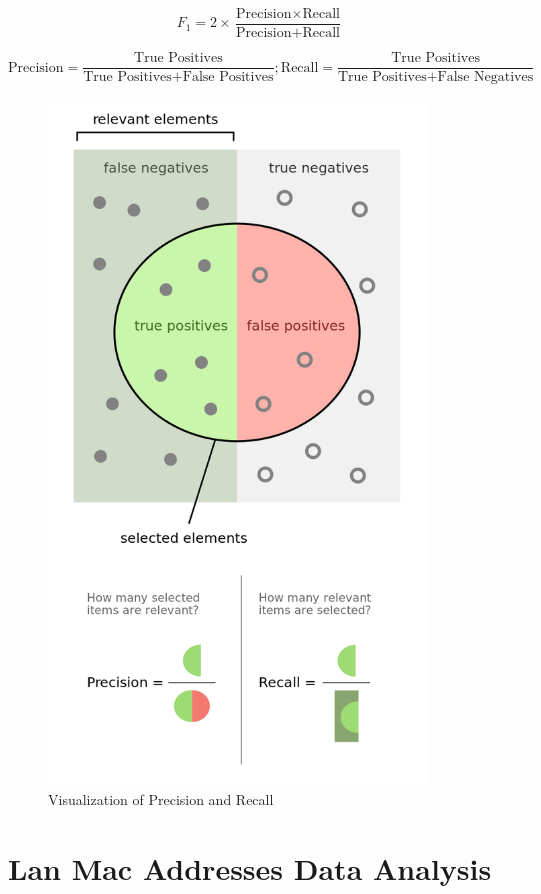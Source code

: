 \documentclass{article}
\begin{document}
\begin{equation*}
    F_{1} = 2\times \frac{\text{Precision} \times \text{Recall}}{\text{Precision} + \text{Recall}}
\end{equation*}

\begin{equation*}
    \text{Precision} = \frac{\text{True Positives}}{\text{True Positives} + \text{False Positives}}
    ;
    \text{Recall} = \frac{\text{True Positives}}{\text{True Positives} + \text{False Negatives}}
\end{equation*}


\begin{figure}[htp]
    \centering
    \includegraphics[width=10cm]{visuals/precisionrecall.png}
    \caption{Visualization of Precision and Recall}
\end{figure}

\newpage

\section{Lan Mac Addresses Data Analysis}
\end{document}
